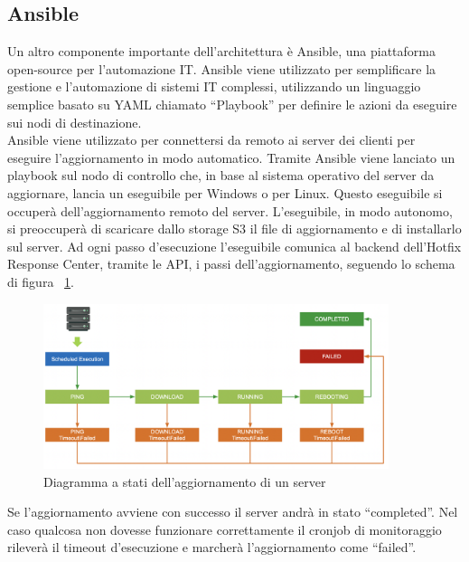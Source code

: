 \label{subsec:Ansible}
\subsection{Ansible}
Un altro componente importante dell’architettura è Ansible, una piattaforma 
open-source per l'automazione IT. Ansible viene utilizzato per semplificare 
la gestione e l'automazione di sistemi IT complessi, utilizzando un 
linguaggio semplice basato su YAML chiamato “Playbook” per 
definire le azioni da eseguire sui nodi di destinazione.\\

Ansible viene utilizzato per connettersi da remoto ai server dei clienti per 
eseguire l’aggiornamento in modo automatico. Tramite Ansible viene lanciato un 
playbook sul nodo di controllo che, in base al sistema operativo del server da 
aggiornare, lancia un eseguibile per Windows o per Linux.
Questo eseguibile si occuperà dell'aggiornamento remoto del server. 
L’eseguibile, in modo autonomo, si preoccuperà di scaricare dallo storage 
S3 il file di aggiornamento e di installarlo sul server. 
Ad ogni passo d’esecuzione l’eseguibile comunica al backend dell’Hotfix Response Center, 
tramite le API, i passi dell’aggiornamento, seguendo lo schema di 
figura ~\ref{fig:Diagramma a stati dell'aggiornamento di un server}.

 \begin{figure}[H]
  \begin{flushright}
    \centering
    \includegraphics[width=0.90\textwidth]{imgs/update_statues.png}
    \caption{Diagramma a stati dell'aggiornamento di un server}
    \label{fig:Diagramma a stati dell'aggiornamento di un server}
  \end{flushright}
\end{figure}

Se l’aggiornamento avviene con successo il server andrà in stato “completed”.
Nel caso qualcosa non dovesse funzionare correttamente il cronjob di monitoraggio 
rileverà il timeout d’esecuzione e marcherà l’aggiornamento come “failed”.
